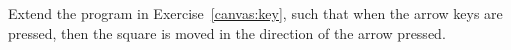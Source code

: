 Extend the program in Exercise~\ref{canvas:key}, such that when the arrow keys are pressed, then the square is moved in the direction of the arrow pressed.
